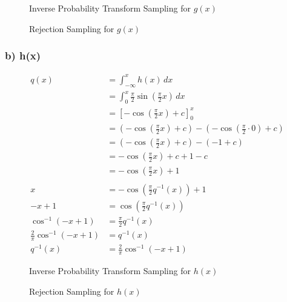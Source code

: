 \begin{figure}[htbp]
    \centering
    
    \caption{Inverse Probability Transform Sampling for $g(x)$}
    \label{fig:2-3-inverse-g}
\end{figure}

\begin{figure}[htbp]
    \centering
    
    \caption{Rejection Sampling for $g(x)$}
    \label{fig:2-3-rejection-g}
\end{figure}

\subsubsection*{b) h(x)}

\begin{align}
q(x)
&= \int_{-\infty}^x h(x)\,dx \\
&= \int_{0}^x \frac{\pi}{2} \sin\left(\frac{\pi}{2} x\right)\,dx \\
&= \left[-\cos\left(\frac{\pi}{2} x\right) + c\right]_0^x \\
&= \left(-\cos\left(\frac{\pi}{2} x\right) + c\right) - \left(-\cos\left(\frac{\pi}{2}\cdot 0\right) + c\right)\\
&= \left(-\cos\left(\frac{\pi}{2} x\right) + c\right) - \left(-1 + c\right)\\
&= -\cos\left(\frac{\pi}{2} x\right) + c + 1 - c\\
&= -\cos\left(\frac{\pi}{2} x\right) + 1\\
\\
x &= -\cos\left(\frac{\pi}{2} q^{-1}(x)\right) + 1\\
-x + 1 &= \cos\left(\frac{\pi}{2} q^{-1}(x)\right) \\
\cos^{-1}(-x + 1) &= \frac{\pi}{2} q^{-1}(x) \\
\frac{2}{\pi} \cos^{-1}(-x + 1) &= q^{-1}(x) \\
q^{-1}(x) &= \frac{2}{\pi} \cos^{-1}(-x + 1)
\end{align}

\begin{figure}[htbp]
    \centering
    
    \caption{Inverse Probability Transform Sampling for $h(x)$}
    \label{fig:2-3-inverse-h}
\end{figure}

\begin{figure}[htbp]
    \centering
    
    \caption{Rejection Sampling for $h(x)$}
    \label{fig:2-3-rejection-h}
\end{figure}